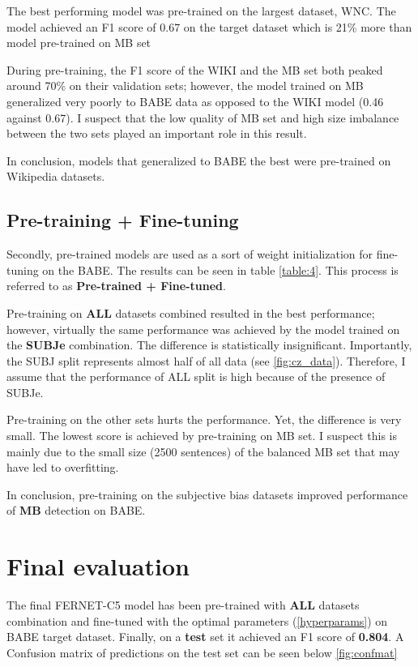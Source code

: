 The best performing model was pre-trained on the largest dataset, WNC. The model achieved an F1 score of 0.67 on the target dataset which is 21\% more than model
pre-trained on MB set

During pre-training, the F1 score of the WIKI and the MB set both peaked around 70\% on their validation sets; however, the model trained on MB generalized very poorly to BABE data as opposed to the WIKI model (0.46 against 0.67). I suspect that the low quality of MB set and high size imbalance between the two sets played an important role in this result.

In conclusion, models that generalized to BABE the best were pre-trained on Wikipedia datasets.

\subsection{Pre-training + Fine-tuning}
Secondly, pre-trained models are used as a sort of weight initialization for fine-tuning on the BABE. The results can be seen in table \ref{table:4}. This process is referred to as \textbf{Pre-trained + Fine-tuned}.

Pre-training on \textbf{ALL} datasets combined resulted in the best performance; however, virtually the same performance was achieved by the model trained on the \textbf{SUBJe} combination. The difference is statistically insignificant. Importantly, the SUBJ split represents almost half of all data (see \ref{fig:cz_data}). Therefore, I assume that the performance of ALL split is high because of the presence of SUBJe.

Pre-training on the other sets hurts the performance. Yet, the difference is very small. The lowest score is achieved by pre-training on MB set. I suspect this is mainly due to the small size (2500 sentences) of the balanced MB set that may have led to overfitting.

In conclusion, pre-training on the subjective bias datasets improved performance of \textbf{MB} detection on BABE.




\section{Final evaluation}\label{classifier}
The final FERNET-C5 model has been pre-trained with \textbf{ALL} datasets combination and fine-tuned with the optimal parameters (\ref{hyperparams}) on BABE target dataset. Finally, on a \textbf{test} set it achieved an F1 score of \textbf{0.804}. A Confusion matrix of predictions on the test set can be seen below \ref{fig:confmat}

